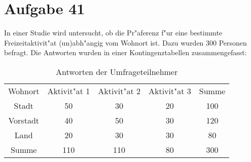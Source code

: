 \section{Aufgabe 41}
\setcounter{section}{41}

In einer Studie wird untersucht, ob die Pr"aferenz f"ur eine bestimmte
Freizeitaktivit"at (un)abh"angig vom Wohnort ist. Dazu wurden 300 Personen
befragt. Die Antworten wurden in einer Kontingenztabellen zusammengefasst:

\begin{table}[h]
    \centering
    \begin{tabular}{|c|c|c|c|c|}
        \hline
        Wohnort  & Aktivit"at 1 & Aktivit"at 2 & Aktivit"at 3 & Summe \\
        Stadt    & 50           & 30           & 20           & 100 \\
        Vorstadt & 40           & 50           & 30           & 120 \\
        Land     & 20           & 30           & 30           & 80 \\
        Summe    & 110          & 110          & 80           & 300 \\ \hline
    \end{tabular}
    \caption{Antworten der Umfrageteilnehmer}
\end{table}

